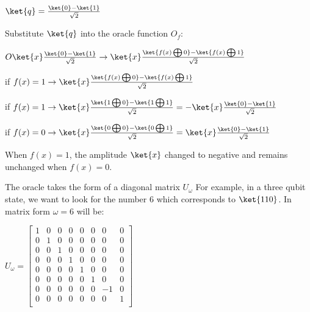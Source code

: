 \documentclass{article}
\begin{document}
\qquad $\ket{q} = \frac{\ket{0} - \ket{1}}{\sqrt{2}}$
\vspace{5mm}

Substitute $\ket{q}$ into the oracle function $O_f$:
\vspace{5mm}

\qquad \qquad $ O\ket{x}\frac{\ket{0} - \ket{1}}{\sqrt{2}} \rightarrow \ket{x} \frac{\ket{f(x) \bigoplus 0} - \ket{f(x) \bigoplus 1}}{\sqrt{2}}$
\vspace{5mm}

\qquad if $ f(x) =1 \rightarrow \ket{x}\frac{\ket{f(x) \bigoplus0} - \ket{f(x) \bigoplus1}}{\sqrt{2}}$
\vspace{5mm}

\qquad if $f(x) =1 \rightarrow \ket{x}\frac{\ket{1 \bigoplus 0} - \ket{1 \bigoplus 1}}{\sqrt{2}} = -\ket{x}\frac{\ket{0} - \ket{1}}{\sqrt{2}}$
\vspace{5mm}

\noindent
\qquad if $f(x) =0 \rightarrow \ket{x}\frac{\ket{0 \bigoplus 0} - \ket{0 \bigoplus 1}}{\sqrt{2}} = \ket{x}\frac{\ket{0} - \ket{1}}{\sqrt{2}}$
\vspace{5mm}

\noindent
When $f(x) = 1 $, the amplitude $\ket{x}$ changed to negative and remains unchanged when $f(x) = 0$.
\pagebreak

\noindent
The oracle takes the form of a diagonal matrix $U_{\omega}$
\vspace{5mm}
\noindent
For example, in a three qubit state, we want to look for the number 6 which corresponds to $\ket{110}$. In matrix form $\omega =6$ will be:
\vspace{5mm}

\qquad $ U_\omega = \begin{bmatrix}

1 & 0 & 0 & 0 & 0& 0 & 0& 0 \\
0 & 1 & 0 & 0 & 0& 0 & 0& 0 \\
0 & 0 & 1 & 0 & 0& 0 & 0& 0 \\
0 & 0 & 0 & 1 & 0& 0 & 0& 0 \\
0 & 0 & 0 & 0 & 1& 0 & 0& 0 \\
0 & 0 & 0 & 0 & 0& 1 & 0& 0 \\
0 & 0 & 0 & 0 & 0& 0 & -1& 0 \\
0 & 0 & 0 & 0 & 0& 0 & 0& 1 \\

\end{bmatrix}$
\vspace{5mm}
\end{document}

